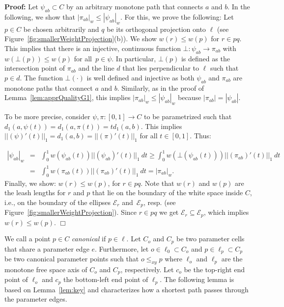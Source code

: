 \documentclass[a4paper,11pt]{article}
\newenvironment{proof}{\textbf{Proof:}}{\hspace*{0mm}\hfill\ensuremath{\Box}}
\begin{document}
\begin{proof} Let $\psi_{ab} \subset C$ by an arbitrary monotone path that connects $a$ and $b$. In the following, we show that $|\pi_{ab}|_w \leq |\psi_{ab}|_w$. For this, we prove the following: Let $p \in C$ be chosen arbitrarily and $q$  be its orthogonal projection onto $\ell$ (see Figure~\ref{fig:smallerWeightProjection}(b)). We show $w(r) \leq w(p)$ for $r \in pq$. This implies that there is an injective, continuous function $\bot: \psi_{ab} \rightarrow \pi_{ab}$ with $w(\bot(p)) \leq w(p)$ for all~$p \in \psi$. In particular, $\bot(p)$ is defined as the intersection point of $\pi_{ab}$ and the line $d$ that lies perpendicular to $\ell$ such that $p \in d$. The function $\bot(\cdot)$ is well defined and injective as both $\psi_{ab}$ and $\pi_{ab}$ are monotone paths that connect $a$ and $b$. Similarly, as in the proof of Lemma~\ref{lem:apprQualityG1}, this implies $|\pi_{ab}|_w \leq |\psi_{ab}|_w$ because $|\pi_{ab}| = |\psi_{ab}|$.

	To be more precise, consider $\psi, \pi: [0,1] \rightarrow C$ to be parametrized such that $d_1(a,\psi(t)) = d_1(a,\pi(t)) = td_1(a, b)$. This implies $||(\psi)'(t)||_1 =d_1(a,b)= ||(\pi)'(t)||_1$ for all $t \in [0,1]$. Thus:
	
	\begin{eqnarray*}
		|\psi_{ab}|_w & = & \int_{0}^1 w (\psi_{ab}(t))  || (\psi_{ab})'(t)||_1\ dt \geq  \int_{0}^1 w (\bot (\psi_{ab}(t)))  || (\pi_{ab})'(t)||_1\ dt\\
		& =& \int_{0}^1 w (\pi_{ab}(t))  || (\pi_{ab})'(t)||_1\ dt = | \pi_{ab}|_w.
	\end{eqnarray*}
	Finally, we show:  $w(r) \leq w(p)$, for $r \in pq$. Note that $w(r)$ and $w(p)$ are the leash lengths for  $r$ and $p$ that lie on the boundary of the white space inside $C$, i.e., on the boundary of the ellipses $\mathcal{E}_{r}$ and~$\mathcal{E}_p$, resp. (see Figure~\ref{fig:smallerWeightProjection}). Since $r \in pq$ we get $\mathcal{E}_r \subseteq \mathcal{E}_p$, which implies $w(r) \leq w(p)$.
\end{proof}

	We call a point $p \in C$ \emph{canonical} if $p \in \ell$. Let $C_o$ and $C_p$ be two parameter cells that share a parameter edge $e$. Furthermore, let $o \in \ell_0 \subset C_o$  and $p \in \ell_p \subset C_p$ be two canonical parameter points such that $o \leq_{xy} p$ where $\ell_o$ and $\ell_p$ are the monotone free space axis of $C_o$ and $C_p$, respectively. Let $c_o$ be the top-right end point of $\ell_o$ and $c_p$ the bottom-left end point of $\ell_p$. The following lemma is based on Lemma~\ref{lem:key} and characterizes how a shortest path passes through the parameter edges.\\ 
\end{document}
